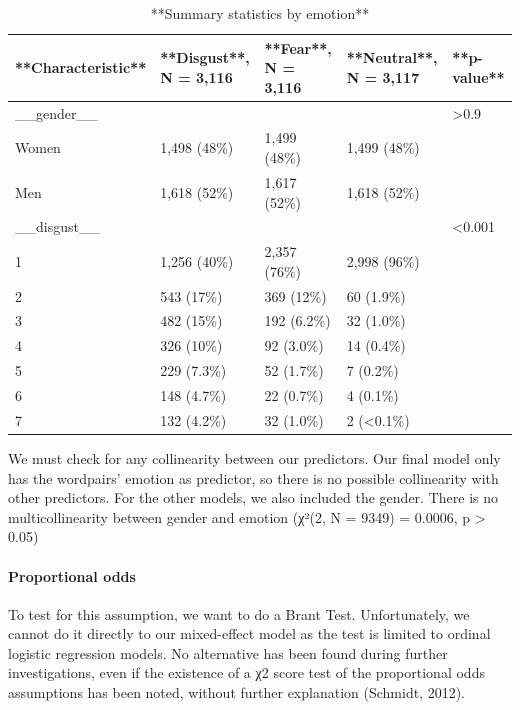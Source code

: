 \documentclass[
]{article}
\begin{document}
\begin{table}

\caption{\label{tab:unnamed-chunk-10}**Summary statistics by emotion**}
\centering
\begin{tabular}[t]{l|l|l|l|l}
\hline
**Characteristic** & **Disgust**, N = 3,116 & **Fear**, N = 3,116 & **Neutral**, N = 3,117 & **p-value**\\
\hline
\_\_gender\_\_ &  &  &  & >0.9\\
\hline
Women & 1,498 (48\%) & 1,499 (48\%) & 1,499 (48\%) & \\
\hline
Men & 1,618 (52\%) & 1,617 (52\%) & 1,618 (52\%) & \\
\hline
\_\_disgust\_\_ &  &  &  & <0.001\\
\hline
1 & 1,256 (40\%) & 2,357 (76\%) & 2,998 (96\%) & \\
\hline
2 & 543 (17\%) & 369 (12\%) & 60 (1.9\%) & \\
\hline
3 & 482 (15\%) & 192 (6.2\%) & 32 (1.0\%) & \\
\hline
4 & 326 (10\%) & 92 (3.0\%) & 14 (0.4\%) & \\
\hline
5 & 229 (7.3\%) & 52 (1.7\%) & 7 (0.2\%) & \\
\hline
6 & 148 (4.7\%) & 22 (0.7\%) & 4 (0.1\%) & \\
\hline
7 & 132 (4.2\%) & 32 (1.0\%) & 2 (<0.1\%) & \\
\hline
\end{tabular}
\end{table}

We must check for any collinearity between our predictors. Our final
model only has the wordpairs' emotion as predictor, so there is no
possible collinearity with other predictors. For the other models, we
also included the gender. There is no multicollinearity between gender
and emotion (χ²(2, N = 9349) = 0.0006, p \textgreater{} 0.05)

\hypertarget{proportional-odds}{%
\paragraph{Proportional odds}\label{proportional-odds}}

To test for this assumption, we want to do a Brant Test. Unfortunately,
we cannot do it directly to our mixed-effect model as the test is
limited to ordinal logistic regression models. No alternative has been
found during further investigations, even if the existence of a χ2 score
test of the proportional odds assumptions has been noted, without
further explanation (Schmidt, 2012).
\end{document}
